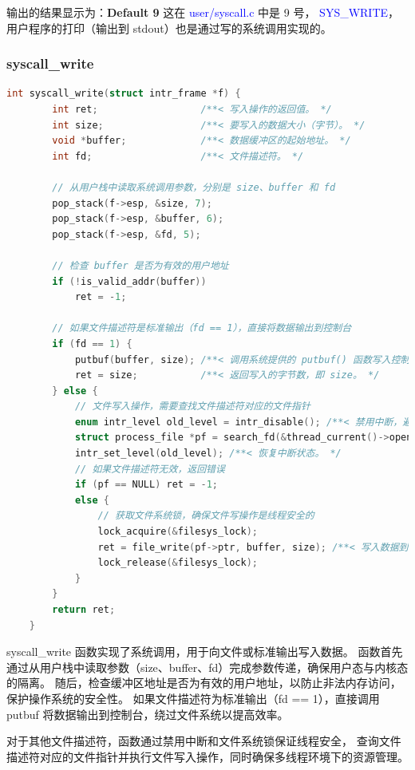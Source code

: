 \documentclass[14pt,a4paper,UTF8,twoside]{article}
\renewcommand{\texttt}[1]{\textcolor{blue}{\ttfamily #1}}
\begin{document}
输出的结果显示为：\textbf{Default 9} 这在 \texttt{user/syscall.c} 中是 9 号， \texttt{SYS\_WRITE}，用户程序的打印（输出到 stdout）也是通过写的系统调用实现的。

\subsubsection{syscall\_write}

\begin{lstlisting}[language=C, title= syscall\_write()]
    int syscall_write(struct intr_frame *f) {
        int ret;                  /**< 写入操作的返回值。 */
        int size;                 /**< 要写入的数据大小（字节）。 */
        void *buffer;             /**< 数据缓冲区的起始地址。 */
        int fd;                   /**< 文件描述符。 */
    
        // 从用户栈中读取系统调用参数，分别是 size、buffer 和 fd
        pop_stack(f->esp, &size, 7);
        pop_stack(f->esp, &buffer, 6);
        pop_stack(f->esp, &fd, 5);
    
        // 检查 buffer 是否为有效的用户地址
        if (!is_valid_addr(buffer))
            ret = -1;

        // 如果文件描述符是标准输出（fd == 1），直接将数据输出到控制台
        if (fd == 1) {
            putbuf(buffer, size); /**< 调用系统提供的 putbuf() 函数写入控制台。 */
            ret = size;           /**< 返回写入的字节数，即 size。 */
        } else {
            // 文件写入操作，需要查找文件描述符对应的文件指针
            enum intr_level old_level = intr_disable(); /**< 禁用中断，避免多线程竞争。 */
            struct process_file *pf = search_fd(&thread_current()->opened_files, fd);
            intr_set_level(old_level); /**< 恢复中断状态。 */
            // 如果文件描述符无效，返回错误
            if (pf == NULL) ret = -1;
            else {
                // 获取文件系统锁，确保文件写操作是线程安全的
                lock_acquire(&filesys_lock);
                ret = file_write(pf->ptr, buffer, size); /**< 写入数据到文件，返回写入字节数。 */
                lock_release(&filesys_lock);
            }
        }
        return ret;
    }
\end{lstlisting}

\begin{ctt}
syscall\_write 函数实现了系统调用，用于向文件或标准输出写入数据。
函数首先通过从用户栈中读取参数（size、buffer、fd）完成参数传递，确保用户态与内核态的隔离。
随后，检查缓冲区地址是否为有效的用户地址，以防止非法内存访问，保护操作系统的安全性。
如果文件描述符为标准输出（fd == 1），直接调用 putbuf 将数据输出到控制台，绕过文件系统以提高效率。

\vspace{0.5cm}

对于其他文件描述符，函数通过禁用中断和文件系统锁保证线程安全，
查询文件描述符对应的文件指针并执行文件写入操作，同时确保多线程环境下的资源管理。
\end{ctt}
\end{document}
